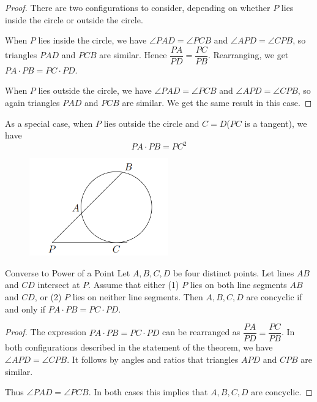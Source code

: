 \begin{proof}
There are two configurations to consider, depending on whether $P$ lies inside the circle or outside the circle.

When $P$ lies inside the circle, we have $\angle PAD = \angle PCB$ and $\angle APD = \angle CPB$, so triangles $PAD$ and $PCB$ are similar. Hence $\dfrac{PA}{PD} = \dfrac{PC}{PB}$. Rearranging, we get $PA \cdot PB = PC \cdot PD$.

When $P$ lies outside the circle, we have $\angle PAD = \angle PCB$ and $\angle APD = \angle CPB$, so again triangles $PAD$ and $PCB$ are similar. We get the same result in this case.
\end{proof}

As a special case, when $P$ lies outside the circle and $C=D$($PC$ is a tangent), we have \begin{equation} PA \cdot PB = PC^2 \end{equation}

\begin{figure}[H]
    \centering
    \includegraphics[width=6cm]{images/Power_of_a_point2.png}
\end{figure}
\pagebreak

\begin{thrm}{Converse to Power of a Point}{}
Let $A, B, C, D$ be four distinct points. Let lines $AB$ and $CD$ intersect at $P$. Assume that either (1) $P$ lies on both line segments $AB$ and $CD$, or (2) $P$ lies on neither line segments. Then $A, B, C, D$ are concyclic if and only if $PA \cdot PB = PC \cdot PD$.
\end{thrm}

\begin{proof}
The expression $PA \cdot PB = PC \cdot PD$ can be rearranged as $\dfrac{PA}{PD} = \dfrac{PC}{PB}$. In both configurations described in the statement of the theorem, we have $\angle APD = \angle CPB$. It follows by angles and ratios that triangles $APD$ and $CPB$ are similar.

Thus $\angle PAD = \angle PCB$. In both cases this implies that $A, B, C, D$ are concyclic.
\end{proof}

